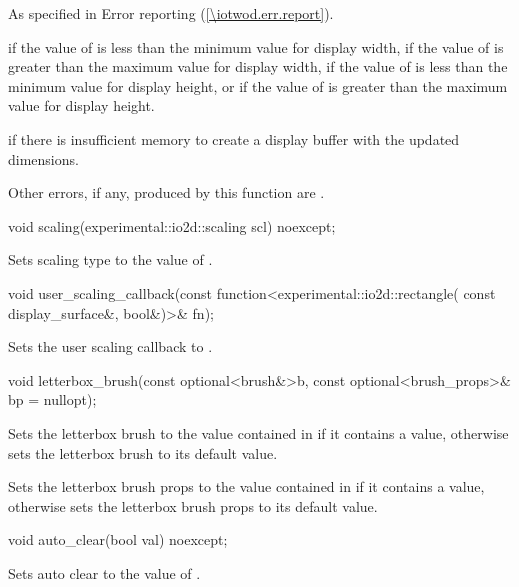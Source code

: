 \begin{itemdescr}
\pnum
\throws
As specified in Error reporting (\ref{\iotwod.err.report}).

\pnum
\errors
{} if the value of  is less than the minimum value for display width, if the value of  is greater than the maximum value for display width, if the value of  is less than the minimum value for display height, or if the value of  is greater than the maximum value for display height.

\pnum
{} if there is insufficient memory to create a display buffer with the updated dimensions.

\pnum
Other errors, if any, produced by this function are .
\end{itemdescr}

%
\begin{itemdecl}
void scaling(experimental::io2d::scaling scl) noexcept;
\end{itemdecl}
\begin{itemdescr}
\pnum
\effects
Sets scaling type to the value of .
\end{itemdescr}

%
\begin{itemdecl}
void user_scaling_callback(const function<experimental::io2d::rectangle(
  const display_surface&, bool&)>& fn);
\end{itemdecl}
\begin{itemdescr}
\pnum
\effects
Sets the user scaling callback to .
\end{itemdescr}

%
\begin{itemdecl}
void letterbox_brush(const optional<brush&>b,
  const optional<brush_props>& bp = nullopt);
\end{itemdecl}
\begin{itemdescr}
\pnum
\effects
Sets the letterbox brush to the value contained in  if it contains a value, otherwise sets the letterbox brush to its default value.

\pnum
Sets the letterbox brush props to the value contained in  if it contains a value, otherwise sets the letterbox brush props to its default value.
\end{itemdescr}

%
\begin{itemdecl}
void auto_clear(bool val) noexcept;
\end{itemdecl}
\begin{itemdescr}
\pnum
\effects
Sets auto clear to the value of .
\end{itemdescr}

